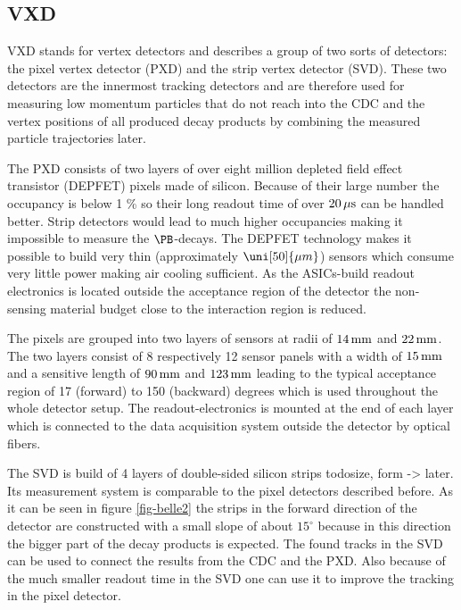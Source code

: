 \subsection{VXD}
VXD stands for vertex detectors and describes a group of two sorts of detectors: the pixel vertex detector (PXD) and the strip vertex detector (SVD). These two detectors are the innermost tracking detectors and are therefore used for measuring low momentum particles that do not reach into the CDC and the vertex positions of all produced decay products by combining the measured particle trajectories later.

The PXD consists of two layers of over eight million depleted field effect transistor (DEPFET) pixels made of silicon. Because of their large number the occupancy is below 1 \% so their long readout time of over $\unit[20]{\mu s}$ can be handled better. Strip detectors would lead to much higher occupancies making it impossible to measure the $\PB$-decays. 
The DEPFET technology makes it possible to build very thin (approximately $\uni[50]{\mu m}$) sensors which consume very little power making air cooling sufficient. As the ASICs-build readout electronics is located outside the acceptance region of the detector the non-sensing material budget close to the interaction region is reduced.

The pixels are grouped into two layers of sensors at radii of $\unit[14]{mm}$ and $\unit[22]{mm}$. The two layers consist of 8 respectively 12 sensor panels with a width of $\unit[15]{mm}$ and a sensitive length of $\unit[90]{mm}$ and $\unit[123]{mm}$ leading to the typical acceptance region of 17 (forward) to 150 (backward) degrees which is used throughout the whole detector setup. The readout-electronics is mounted at the end of each layer which is connected to the data acquisition system outside the detector by optical fibers.



The SVD is build of 4 layers of double-sided silicon strips todo{size, form -> later}. Its measurement system is comparable to the pixel detectors described before. As it can be seen in figure \ref{fig-belle2} the strips in the forward direction of the detector are constructed with a small slope of about $15^\circ$ because in this direction the bigger part of the decay products is expected. The found tracks in the SVD can be used to connect the results from the CDC and the PXD. Also because of the much smaller readout time in the SVD one can use it to improve the tracking in the pixel detector. 
